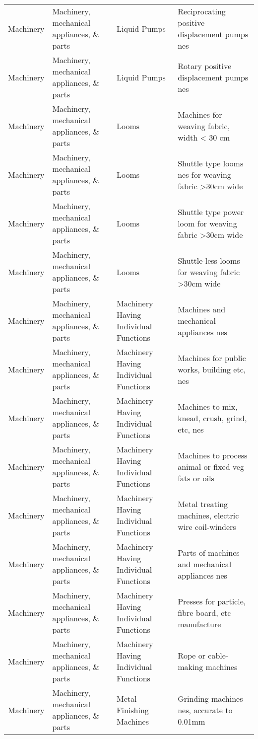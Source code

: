\begin{appendices}
\begin{xltabular}{\textwidth}{|p{0.07\textwidth}|p{0.25\textwidth}|p{0.28\textwidth}|p{0.3\textwidth}|}
		Machinery & Machinery, mechanical appliances, \& parts & Liquid Pumps & Reciprocating positive displacement pumps nes \\
		Machinery & Machinery, mechanical appliances, \& parts & Liquid Pumps & Rotary positive displacement pumps nes \\
		Machinery & Machinery, mechanical appliances, \& parts & Looms & Machines for weaving fabric, width < 30 cm \\
		Machinery & Machinery, mechanical appliances, \& parts & Looms & Shuttle type looms nes for weaving fabric >30cm wide \\
		Machinery & Machinery, mechanical appliances, \& parts & Looms & Shuttle type power loom for weaving fabric >30cm wide \\
		Machinery & Machinery, mechanical appliances, \& parts & Looms & Shuttle-less looms for weaving fabric >30cm wide \\
		Machinery & Machinery, mechanical appliances, \& parts & Machinery Having Individual Functions & Machines and mechanical appliances nes \\
		Machinery & Machinery, mechanical appliances, \& parts & Machinery Having Individual Functions & Machines for public works, building etc, nes \\
		Machinery & Machinery, mechanical appliances, \& parts & Machinery Having Individual Functions & Machines to mix, knead, crush, grind, etc, nes \\
		Machinery & Machinery, mechanical appliances, \& parts & Machinery Having Individual Functions & Machines to process animal or fixed veg fats or oils \\
		Machinery & Machinery, mechanical appliances, \& parts & Machinery Having Individual Functions & Metal treating machines, electric wire coil-winders \\
		Machinery & Machinery, mechanical appliances, \& parts & Machinery Having Individual Functions & Parts of machines and mechanical appliances nes \\
		Machinery & Machinery, mechanical appliances, \& parts & Machinery Having Individual Functions & Presses for particle, fibre board, etc manufacture \\
		Machinery & Machinery, mechanical appliances, \& parts & Machinery Having Individual Functions & Rope or cable-making machines \\
		Machinery & Machinery, mechanical appliances, \& parts & Metal Finishing Machines & Grinding machines nes, accurate to 0.01mm \\

\end{xltabular}
\end{appendices}
